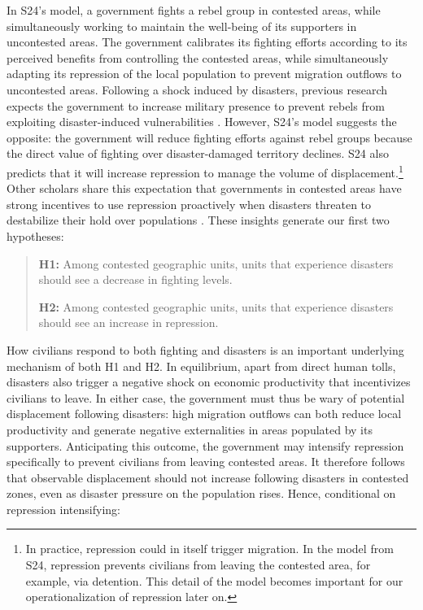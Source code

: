 \documentclass[bibtex]{article}
\begin{document}
In S24's model, a government fights a rebel group in contested areas, while simultaneously working to maintain the well-being of its supporters in uncontested areas. The government calibrates its fighting efforts according to its perceived benefits from controlling the contested areas, while simultaneously adapting its repression of the local population to prevent migration outflows to uncontested areas. Following a shock induced by disasters, previous research expects the government to increase military presence to prevent rebels from exploiting disaster-induced vulnerabilities \citep{wood2016responding, zhao_2025}. However, S24's model suggests the opposite: the government will reduce fighting efforts against rebel groups because the direct value of fighting over disaster-damaged territory declines. S24 also predicts that it will increase repression to manage the volume of displacement.\footnote{In practice, repression could in itself trigger migration. In the model from S24, repression prevents civilians from leaving the contested area, for example, via detention. This detail of the model becomes important for our operationalization of repression later on.} Other scholars share this expectation that governments in contested areas have strong incentives to use repression proactively when disasters threaten to destabilize their hold over populations \citep{wood2016responding}. These insights generate our first two hypotheses:

\begin{quote}
\textbf{H1:} Among contested geographic units, units that experience disasters should see a decrease in fighting levels.

\textbf{H2:} Among contested geographic units, units that experience disasters should see an increase in repression.
\end{quote}

How civilians respond to both fighting and disasters is an important underlying mechanism of both H1 and H2. In equilibrium, apart from direct human tolls, disasters also trigger a negative shock on economic productivity that incentivizes civilians to leave. In either case, the government must thus be wary of potential displacement following disasters: high migration outflows can both reduce local productivity and generate negative externalities in areas populated by its supporters. Anticipating this outcome, the government may intensify repression specifically to prevent civilians from leaving contested areas. It therefore follows that observable displacement should not increase following disasters in contested zones, even as disaster pressure on the population rises. Hence, conditional on repression intensifying:
\end{document}
